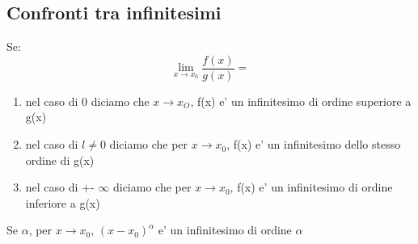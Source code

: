 \documentclass{article}
\begin{document}
        \subsection{Confronti tra infinitesimi}
        \begin{flushleft}
            Se:
            \begin{equation}
                \lim_{x \to x_0} \frac{f(x)}{g(x)} =
                \label{eq:}
            \end{equation}
            \begin{enumerate}
                \item  nel caso di 0 diciamo che $x\to x_O$, f(x) e' un
                        infinitesimo di ordine superiore a g(x)
                \item nel caso di $l \neq 0$ diciamo che per $x \to x_0$, f(x) e' un
                        infinitesimo dello stesso ordine di g(x)
                \item nel caso di +- $\infty$ diciamo che per $x \to x_0$, f(x) e' un infinitesimo
                    di ordine inferiore a g(x)
            \end{enumerate}
            Se $\alpha$, per $x\to x_0$, $(x-x_0)^\alpha$ e' un infinitesimo di ordine $\alpha$
        \end{flushleft}
\end{document}
